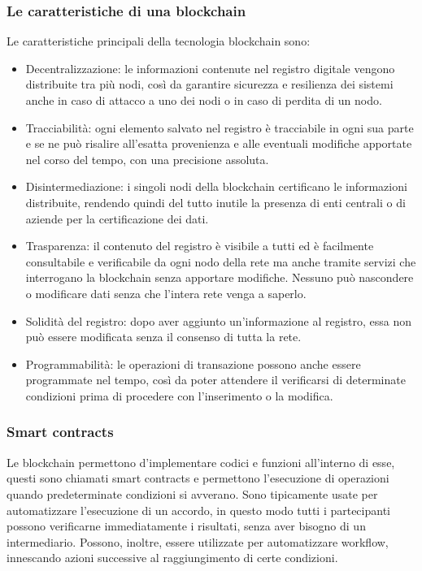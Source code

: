 \documentclass[a4paper]{article}
\begin{document}
    \subsubsection{Le caratteristiche di una blockchain}
    Le caratteristiche principali della tecnologia blockchain sono:
    \begin{itemize}
      \item Decentralizzazione: le informazioni contenute nel registro digitale vengono distribuite tra più nodi, così da garantire sicurezza e resilienza dei sistemi anche in caso di attacco a uno dei nodi o in caso di perdita di un nodo.
      \item Tracciabilità: ogni elemento salvato nel registro è tracciabile in ogni sua parte e se ne può risalire all’esatta provenienza e alle eventuali modifiche apportate nel corso del tempo, con una precisione assoluta.
      \item Disintermediazione: i singoli nodi della blockchain certificano le informazioni distribuite, rendendo quindi del tutto inutile la presenza di enti centrali o di aziende per la certificazione dei dati.
      \item Trasparenza: il contenuto del registro è visibile a tutti ed è facilmente consultabile e verificabile da ogni nodo della rete ma anche tramite servizi che interrogano la blockchain senza apportare modifiche. Nessuno può nascondere o modificare dati senza che l'intera rete venga a saperlo.
      \item Solidità del registro: dopo aver aggiunto un'informazione al registro, essa non può essere modificata senza il consenso di tutta la rete.
      \item Programmabilità: le operazioni di transazione possono anche essere programmate nel tempo, così da poter attendere il verificarsi di determinate condizioni prima di procedere con l'inserimento o la modifica\cite{blockchain1}.
    \end{itemize}
    \subsubsection{Smart contracts}
    Le blockchain permettono d'implementare codici e funzioni all'interno di esse, questi sono chiamati smart contracts e permettono l'esecuzione di operazioni quando predeterminate condizioni si avverano.
    Sono tipicamente usate per automatizzare l'esecuzione di un accordo, in questo modo tutti i partecipanti possono verificarne immediatamente i risultati, senza aver bisogno di un intermediario.
    Possono, inoltre, essere utilizzate per automatizzare workflow, innescando azioni successive al raggiungimento di certe condizioni\cite{smartcontracts}.
    
\end{document}

